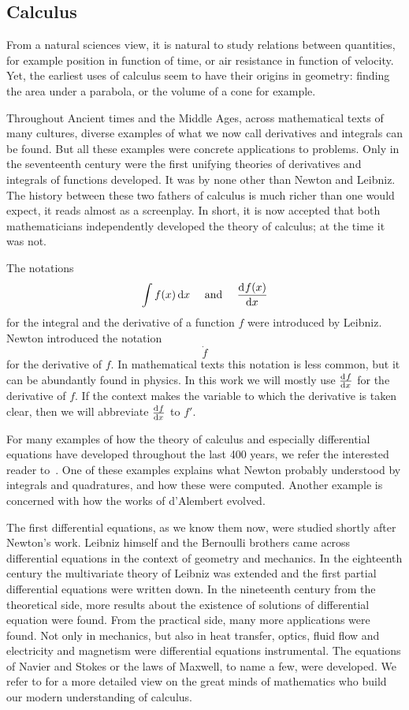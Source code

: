 \subsection{Calculus}

From a natural sciences view, it is natural to study relations between quantities, for example position in function of time, or air resistance in function of velocity. Yet, the earliest uses of calculus seem to have their origins in geometry: finding the area under a parabola, or the volume of a cone for example.

Throughout Ancient times and the Middle Ages, across mathematical texts of many cultures, diverse examples of what we now call derivatives and integrals can be found. But all these examples were concrete applications to problems. Only in the seventeenth century were the first unifying theories of derivatives and integrals of functions developed. It was by none other than Newton and Leibniz. The history between these two fathers of calculus is much richer than one would expect, it reads almost as a screenplay. In short, it is now accepted that both mathematicians independently developed the theory of calculus; at the time it was not.

The notations
$$
    \int f(x) \, \dd x \quad \text{ and } \quad \dv[]{f(x)}{x}
$$
for the integral and the derivative of a function $f$ were introduced by Leibniz. Newton introduced the notation
$$
    \dot{f}
$$
for the derivative of $f$. In mathematical texts this notation is less common, but it can be abundantly found in physics. In this work we will mostly use $\dv[]{f}{x}$ for the derivative of $f$. If the context makes the variable to which the derivative is taken clear, then we will abbreviate $\dv[]{f}{x}$ to $f'$.

For many examples of how the theory of calculus and especially differential equations have developed throughout the last 400 years, we refer the interested reader to~\cite{archibald_history_2005}. One of these examples explains what Newton probably understood by integrals and quadratures, and how these were computed. Another example is concerned with how the works of d'Alembert evolved.

The first differential equations, as we know them now, were studied shortly after Newton's work. Leibniz himself and the Bernoulli brothers came across differential equations in the context of geometry and mechanics. In the eighteenth century the multivariate theory of Leibniz was extended and the first partial differential equations were written down. In the nineteenth century from the theoretical side, more results about the existence of solutions of differential equation were found. From the practical side, many more applications were found. Not only in mechanics, but also in heat transfer, optics, fluid flow and electricity and magnetism were differential equations instrumental. The equations of Navier and Stokes or the laws of Maxwell, to name a few, were developed. We refer to \cite{simmons_differential_2016} for a more detailed view on the great minds of mathematics who build our modern understanding of calculus.

